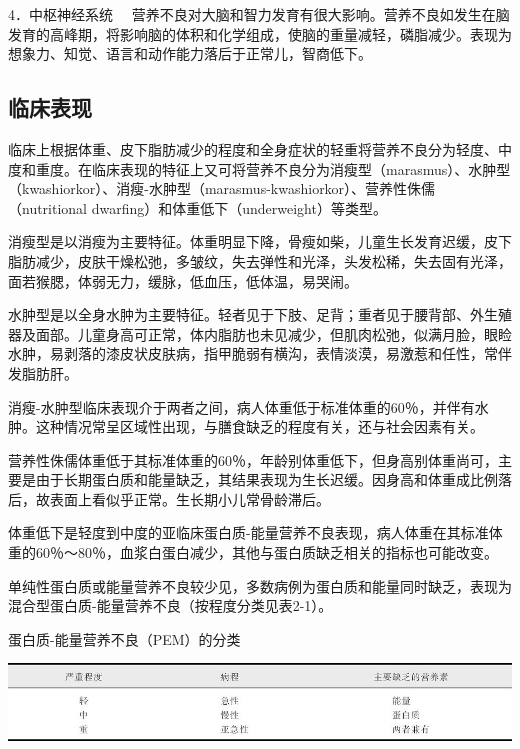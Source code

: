 {4．中枢神经系统}
　营养不良对大脑和智力发育有很大影响。营养不良如发生在脑发育的高峰期，将影响脑的体积和化学组成，使脑的重量减轻，磷脂减少。表现为想象力、知觉、语言和动作能力落后于正常儿，智商低下。

\hypertarget{text00003.htmlux5cux23mllj12}{%
\subsection{临床表现}\label{text00003.htmlux5cux23mllj12}}

临床上根据体重、皮下脂肪减少的程度和全身症状的轻重将营养不良分为轻度、中度和重度。在临床表现的特征上又可将营养不良分为消瘦型（marasmus）、水肿型（kwashiorkor）、消瘦-水肿型（marasmus-kwashiorkor）、营养性侏儒（nutritional
dwarfing）和体重低下（underweight）等类型。

消瘦型是以消瘦为主要特征。体重明显下降，骨瘦如柴，儿童生长发育迟缓，皮下脂肪减少，皮肤干燥松弛，多皱纹，失去弹性和光泽，头发松稀，失去固有光泽，面若猴腮，体弱无力，缓脉，低血压，低体温，易哭闹。

水肿型是以全身水肿为主要特征。轻者见于下肢、足背；重者见于腰背部、外生殖器及面部。儿童身高可正常，体内脂肪也未见减少，但肌肉松弛，似满月脸，眼睑水肿，易剥落的漆皮状皮肤病，指甲脆弱有横沟，表情淡漠，易激惹和任性，常伴发脂肪肝。

消瘦-水肿型临床表现介于两者之间，病人体重低于标准体重的60％，并伴有水肿。这种情况常呈区域性出现，与膳食缺乏的程度有关，还与社会因素有关。

营养性侏儒体重低于其标准体重的60％，年龄别体重低下，但身高别体重尚可，主要是由于长期蛋白质和能量缺乏，其结果表现为生长迟缓。因身高和体重成比例落后，故表面上看似乎正常。生长期小儿常骨龄滞后。

体重低下是轻度到中度的亚临床蛋白质-能量营养不良表现，病人体重在其标准体重的60％～80％，血浆白蛋白减少，其他与蛋白质缺乏相关的指标也可能改变。

单纯性蛋白质或能量营养不良较少见，多数病例为蛋白质和能量同时缺乏，表现为混合型蛋白质-能量营养不良（按程度分类见表2-1）。

\begin{table}[htbp]
\centering
\caption{蛋白质-能量营养不良（PEM）的分类}
\label{tab2-1}
\includegraphics{./images/Image00006.jpg}
\end{table}

